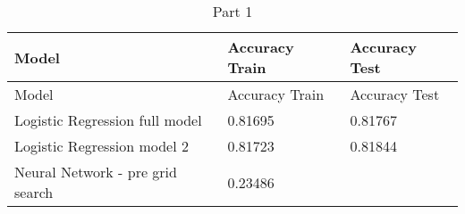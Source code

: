 \documentclass[]{article}
\begin{document}
\begin{longtable}[]{@{}lll@{}}
\caption{Part 1}\tabularnewline
\toprule
\begin{minipage}[b]{0.42\columnwidth}\raggedright\strut
Model\strut
\end{minipage} & \begin{minipage}[b]{0.24\columnwidth}\raggedright\strut
Accuracy Train\strut
\end{minipage} & \begin{minipage}[b]{0.25\columnwidth}\raggedright\strut
Accuracy Test\strut
\end{minipage}\tabularnewline
\midrule
\endfirsthead
\toprule
\begin{minipage}[b]{0.42\columnwidth}\raggedright\strut
Model\strut
\end{minipage} & \begin{minipage}[b]{0.24\columnwidth}\raggedright\strut
Accuracy Train\strut
\end{minipage} & \begin{minipage}[b]{0.25\columnwidth}\raggedright\strut
Accuracy Test\strut
\end{minipage}\tabularnewline
\midrule
\endhead
\begin{minipage}[t]{0.42\columnwidth}\raggedright\strut
Logistic Regression full model\strut
\end{minipage} & \begin{minipage}[t]{0.24\columnwidth}\raggedright\strut
0.81695\strut
\end{minipage} & \begin{minipage}[t]{0.25\columnwidth}\raggedright\strut
0.81767\strut
\end{minipage}\tabularnewline
\begin{minipage}[t]{0.42\columnwidth}\raggedright\strut
Logistic Regression model 2\strut
\end{minipage} & \begin{minipage}[t]{0.24\columnwidth}\raggedright\strut
0.81723\strut
\end{minipage} & \begin{minipage}[t]{0.25\columnwidth}\raggedright\strut
0.81844\strut
\end{minipage}\tabularnewline
\begin{minipage}[t]{0.42\columnwidth}\raggedright\strut
Neural Network - pre grid search\strut
\end{minipage} & \begin{minipage}[t]{0.24\columnwidth}\raggedright\strut
0.23486\strut
\end{minipage} & \begin{minipage}[t]{0.25\columnwidth}\raggedright\strut

\end{minipage}
\end{longtable}
\end{document}
